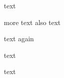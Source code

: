 \documentclass{article}
\begin{document}

\begin{AgdaAlign}
text \begin{code}%
\>[0] \AgdaModule{\_} \<%
\end{code} more text
    also text  \begin{code}%
\>[0][@{}l@{\AgdaIndent{1}}]\<[4]%
\>[4]  \AgdaSymbol{:} \<%
\end{code} text again

 text          \begin{code}%
\>[0][@{}l@{\AgdaIndent{2}}]\<[4]%
\>[4]  \AgdaSymbol{:} \<%
\end{code}   text             
\end{AgdaAlign}

\begin{code}%
\>[0]\<%
\\
\>[0][@{}l@{\AgdaIndent{0}}]\<[1]%
\>[1] \AgdaSymbol{:} \<%
\end{code}

\begin{code}%
\>[0] \AgdaModule{\_} \<%
\\
\>[0][@{}l@{\AgdaIndent{0}}]\<[1]%
\>[1]\<%
\\
\>[1][@{}l@{\AgdaIndent{0}}]\<[2]%
\>[2] \AgdaSymbol{:} \<%
\end{code}

\begin{code}%
\>[0] \AgdaModule{\_} \<%
\\
\>[0][@{}l@{\AgdaIndent{0}}]\<[9]%
\>[9]\<%
\\
\>[9][@{}l@{\AgdaIndent{0}}]\<[10]%
\>[10] \AgdaSymbol{:} \<%
\end{code}

\begin{AgdaMultiCode}{1}
\begin{code}%
\>[0] \AgdaModule{\_} \<%
\end{code}
\begin{code}%
\>[0][@{}l@{\AgdaIndent{1}}]\<[2]%
\>[2]  \AgdaSymbol{:} \<%
\end{code}
\end{AgdaMultiCode}

\begin{AgdaSuppressSpace}{1}
\begin{code}%
\>[0] \AgdaModule{\_} \<%
\end{code}
\begin{code}%
\>[0][@{}l@{\AgdaIndent{1}}]\<[2]%
\>[2]  \AgdaSymbol{:} \<%
\end{code}
\end{AgdaSuppressSpace}
\end{document}
